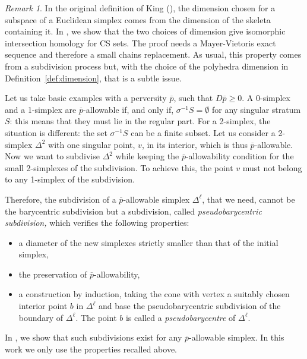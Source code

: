 \documentclass[a4paper,10pt,english,reqno]{amsart}
\theoremstyle{plain}
\theoremstyle{definition}
\theoremstyle{remark}
\newtheorem{remark}[proposition]{Remark}
\numberwithin{equation}{section}
\newcommand{\defref}[1]{Definition~\ref{#1}}
\def\ov{\overline}
\renewcommand\1{\hbox{\ding{192}}}
\renewcommand\2{\hbox{\ding{193}}}
\newcommand\3{\hbox{\ding{194}}}
\newcommand\4{\hbox{\ding{195}}}
\begin{document}
%
%
\begin{remark}\label{rem:pseusobarycenter}
In the original definition of King (\cite{MR800845}), the  dimension chosen for a subspace of a Euclidean simplex 
comes from the dimension of the skeleta containing it. In \cite{CST8}, we show that the 
%
%
two choices of dimension
%
%
 give
 isomorphic intersection homology for CS sets. 
 The proof needs a Mayer-Vietoris exact sequence and therefore a small chains replacement.
 As usual, this property comes from a subdivision process but, with the choice of the polyhedra dimension
 in \defref{def:dimension}, that is a subtle issue.
 
 \smallskip
 Let us take basic examples with a perversity $\ov{p}$, such that $D\ov{p}\geq 0$.
 A 0-simplex and a 1-simplex are $\ov{p}$-allowable if, and only if, $\sigma^{-1}S=\emptyset$ for any singular stratum $S$:
this means that they must lie in the regular part.
For a 2-simplex, the situation is different: the set $\sigma^{-1}S$ can be a finite subset.
Let us consider a 2-simplex $\Delta^2$ with one singular point, $v$, in its interior, which is thus $\ov{p}$-allowable.
Now we want to subdivise $\Delta^2$ while keeping the $\ov{p}$-allowability condition for the small 2-simplexes of the
subdivision.
To achieve this, the point $v$ must not belong to any 1-simplex of the subdivision.

%
%
%
\medskip
Therefore, the subdivision of a $\ov{p}$-allowable simplex $\Delta^\ell$, 
that we need, cannot be the barycentric subdivision but 
a subdivision, called  \emph{pseudobarycentric subdivision,} which verifies the following properties:
\begin{itemize}
\item a diameter of the new simplexes strictly smaller than that of the initial simplex,
\item the preservation of $\ov{p}$-allowability,
\item a construction by induction, taking the cone with vertex a suitably chosen interior point $b$ in  $\Delta^\ell$
and base the pseudobarycentric subdivision of the boundary of $\Delta^\ell$. 
The point $b$ is called a \emph{pseudobarycentre} of $\Delta^\ell$.
\end{itemize}
In \cite[Proposition 6]{CST8}, we show that such subdivisions exist for any $\ov{p}$-allowable simplex.
In this work we only use the properties recalled above.
 \end{remark}
 

%
\end{document}
